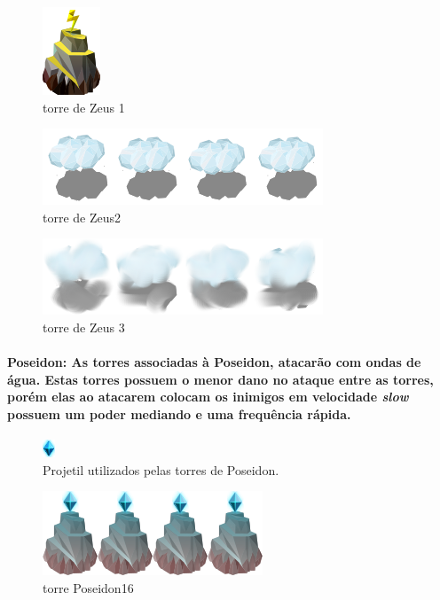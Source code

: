\documentclass[11pt]{article} %
\begin{document}
\begin{figure}[!htp]
\centering
\includegraphics[scale=1.3]{res/towers/tower_1.png}
\caption{torre de Zeus 1}
\end{figure}


\begin{figure}[!htp]
\centering
\includegraphics[scale=1.3]{res/towers/tower_2.png}
\caption{torre de Zeus2 }
\end{figure}


\begin{figure}[!htp]
\centering
\includegraphics[scale=1.3]{res/towers/tower_3.png}
\caption{torre de Zeus 3}
\end{figure}

\newpage

\paragraph{{\Large Poseidon}: As torres associadas à Poseidon, atacarão com ondas de água. Estas torres possuem o menor dano no ataque entre as torres, porém elas ao atacarem colocam os inimigos em velocidade \textit{slow} possuem um poder mediando e uma frequência rápida.}

\begin{figure}[!htp]
\centering
\includegraphics[scale=1]{res/projectiles/projetil_poseidon.png}
\caption{Projetil utilizados pelas torres de Poseidon.}
\end{figure}

\begin{figure}[!htp]
\centering
\includegraphics[scale=1]{res/towers/tower_16.png}
\caption{torre Poseidon16}
\end{figure}
\end{document}
